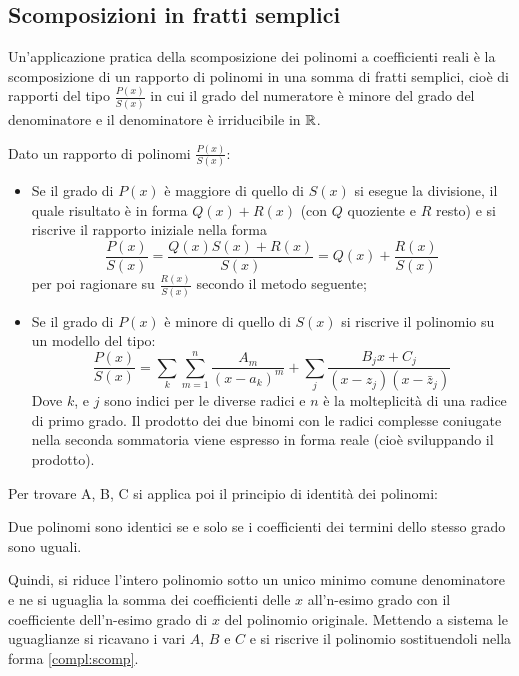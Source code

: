 \subsection{Scomposizioni in fratti semplici}
\label{frattisemplici}
Un'applicazione pratica della scomposizione dei polinomi a coefficienti reali è la scomposizione di un rapporto di polinomi in una somma di fratti semplici, cioè di rapporti del tipo $\frac{P(x)}{S(x)}$ in cui il grado del numeratore è minore del grado del denominatore e il denominatore è irriducibile in $\mathbb{R}$.

Dato un rapporto di polinomi $\frac{P(x)}{S(x)}$:
\begin{itemize}
	\item Se il grado di $P(x)$ è maggiore di quello di $S(x)$ si esegue la divisione, il quale risultato è in forma $Q(x)+R(x)$ (con $Q$ quoziente e $R$ resto) e si riscrive il rapporto iniziale nella forma
	      \[
		      \dfrac{P(x)}{S(x)}=\dfrac{Q(x)S(x)+R(x)}{S(x)}=Q(x)+\dfrac{R(x)}{S(x)}
	      \]
	      per poi ragionare su $\frac{R(x)}{S(x)}$ secondo il metodo seguente;
	\item Se il grado di $P(x)$ è minore di quello di $S(x)$ si riscrive il polinomio su un modello del tipo:
	      \begin{equation}
		      \label{compl:scomp}
		      \frac{P(x)}{S(x)}=\sum_k\sum_{m=1}^n \frac{A_m}{(x-a_k)^m}+\sum_j \frac{B_jx+C_j}{(x-z_j)(x-\bar z_j)}
	      \end{equation}
	      Dove $k$, e $j$ sono indici per le diverse radici e $n$ è la molteplicità di una radice di primo grado. Il prodotto dei due binomi con le radici complesse coniugate nella seconda sommatoria viene espresso in forma reale (cioè sviluppando il prodotto).
\end{itemize}
Per trovare A, B, C si applica poi il principio di identità dei polinomi:
\begin{enunc}
	Due polinomi sono identici se e solo se i coefficienti dei termini dello stesso grado sono uguali.
\end{enunc}
Quindi, si riduce l'intero polinomio sotto un unico minimo comune denominatore e ne si uguaglia la somma dei coefficienti delle $x$ all'n-esimo grado con il coefficiente dell'n-esimo grado di $x$ del polinomio originale. Mettendo a sistema le uguaglianze si ricavano i vari $A$, $B$ e $C$ e si riscrive il polinomio sostituendoli nella forma \ref{compl:scomp}.
